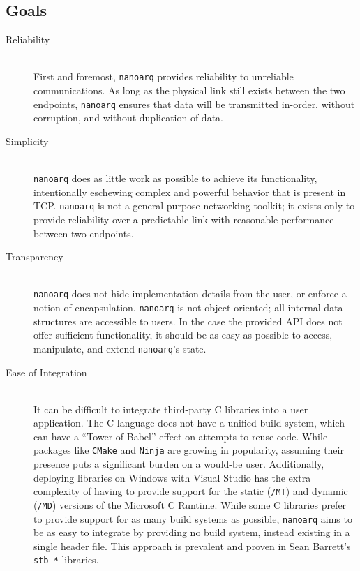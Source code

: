 \documentclass[11pt]{article}
\newcommand{\nanoarq}{\texttt{nanoarq}}
\begin{document}
\subsection{Goals}
\begin{description}
\item[Reliability] \hfill \\
    First and foremost, \nanoarq{} provides reliability to unreliable communications. As long as the physical link still exists between the two endpoints, \nanoarq{} ensures that data will be transmitted in-order, without corruption, and without duplication of data.
\item[Simplicity] \hfill \\
    \nanoarq{} does as little work as possible to achieve its functionality, intentionally eschewing complex and powerful behavior that is present in TCP. \nanoarq{} is not a general-purpose networking toolkit; it exists only to provide reliability over a predictable link with reasonable performance between two endpoints.
\item[Transparency] \hfill \\
    \nanoarq{} does not hide implementation details from the user, or enforce a notion of encapsulation. \nanoarq{} is not object-oriented; all internal data structures are accessible to users. In the case the provided API does not offer sufficient functionality, it should be as easy as possible to access, manipulate, and extend \nanoarq{}'s state.
\item[Ease of Integration] \hfill \\
    It can be difficult to integrate third-party C libraries into a user application. The C language does not have a unified build system, which can have a \enquote{Tower of Babel} effect on attempts to reuse code. While packages like \texttt{CMake} and \texttt{Ninja} are growing in popularity, assuming their presence puts a significant burden on a would-be user. Additionally, deploying libraries on Windows with Visual Studio has the extra complexity of having to provide support for the static (\texttt{/MT}) and dynamic (\texttt{/MD}) versions of the Microsoft C Runtime. While some C libraries prefer to provide support for as many build systems as possible, \nanoarq{} aims to be as easy to integrate by providing no build system, instead existing in a single header file. This approach is prevalent and proven in Sean Barrett's \texttt{stb\_*} libraries. \par

\end{description}
\end{document}
